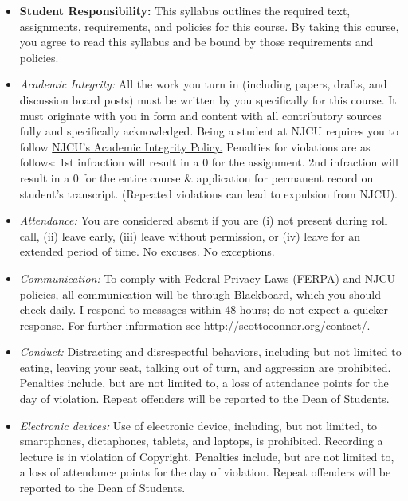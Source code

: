 \documentclass[article,oneside]{memoir}
\begin{document}
\begin{itemize}

\item \textbf{Student Responsibility:} This syllabus outlines the required text, assignments, requirements, and policies for this course. By taking this course, you agree to read this syllabus and be bound by those requirements and policies. 

 \item \textit{Academic Integrity:} All the work you turn in (including papers, drafts, and discussion board posts) must be written by you specifically for this course. It must originate with you in form and content with all contributory sources fully and specifically acknowledged. Being a student at NJCU requires you to follow \href{http://scottoconnor.org/resources/Plagiarism.pdf}{NJCU's Academic Integrity Policy.} Penalties for violations are as follows: 1st infraction will result in a 0 for the assignment.  2nd infraction will result in a 0 for the entire course \& application for permanent record on student's transcript. (Repeated violations can lead to expulsion from NJCU). 


\item \textit{Attendance:} You are considered absent if you are (i) not present during roll call, (ii) leave early, (iii) leave without permission, or (iv) leave for an extended period of time. No excuses. No exceptions.



\item \textit{Communication:} To comply with Federal Privacy Laws (FERPA) and NJCU policies, all communication will be through Blackboard, which you should check daily. I respond to messages within 48 hours; do not expect a quicker response. For further information see \href{http://scottoconnor.org/contact/}{http://scottoconnor.org/contact/}.

\item \textit{Conduct:} Distracting and disrespectful behaviors, including but not limited to eating, leaving your seat, talking out of turn, and aggression are prohibited. Penalties include, but are not limited to, a loss of attendance points for the day of violation. Repeat offenders will be reported to the Dean of Students. 

\item \textit{Electronic devices:} Use of electronic device, including, but not limited, to smartphones, dictaphones, tablets, and laptops, is prohibited. Recording a lecture is in violation of Copyright. Penalties include, but are not limited to, a loss of attendance points for the day of violation. Repeat offenders will be reported to the Dean of Students.



\end{itemize}
\end{document}
